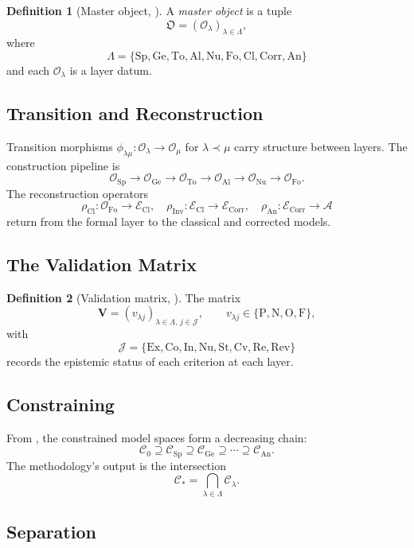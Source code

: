 \documentclass[11pt,a4paper]{article}
\theoremstyle{definition}
\newtheorem{definition}{Definition}[section]
\theoremstyle{plain}
\newcommand{\Lam}{\Lambda}
\newcommand{\Sp}{\mathrm{Sp}}
\newcommand{\Ge}{\mathrm{Ge}}
\newcommand{\To}{\mathrm{To}}
\newcommand{\Al}{\mathrm{Al}}
\newcommand{\Nu}{\mathrm{Nu}}
\newcommand{\Fo}{\mathrm{Fo}}
\newcommand{\Cl}{\mathrm{Cl}}
\newcommand{\Corr}{\mathrm{Corr}}
\newcommand{\Inv}{\mathrm{Inv}}
\newcommand{\An}{\mathrm{An}}
\newcommand{\Ob}{\mathfrak{O}}
\newcommand{\Ccal}{\mathcal{C}}
\newcommand{\Acal}{\mathcal{A}}
\newcommand{\Ecal}{\mathcal{E}}
\newcommand{\Ocal}{\mathcal{O}}
\newcommand{\philam}{\phi_{\lambda\mu}}
\newcommand{\Vmat}{\mathbf{V}}
\newcommand{\Jset}{\mathcal{J}}
\newcommand{\Pmark}{\mathrm{P}}
\newcommand{\Nmark}{\mathrm{N}}
\newcommand{\Omark}{\mathrm{O}}
\newcommand{\Fmark}{\mathrm{F}}
\begin{document}
\begin{definition}[Master object, {\cite[Definition 1.1]{framework}}]
A \emph{master object} is a tuple
\[
  \Ob = (\Ocal_\lambda)_{\lambda \in \Lam},
\]
where
\[
  \Lam = \{\Sp, \Ge, \To, \Al, \Nu, \Fo, \Cl, \Corr, \An\}
\]
and each $\Ocal_\lambda$ is a layer datum.
\end{definition}

\subsection{Transition and Reconstruction}

Transition morphisms $\philam : \Ocal_\lambda \to \Ocal_\mu$ for
$\lambda \prec \mu$ carry structure between layers. The
construction pipeline is
\[
  \Ocal_\Sp \to \Ocal_\Ge \to \Ocal_\To \to \Ocal_\Al
  \to \Ocal_\Nu \to \Ocal_\Fo .
\]
The reconstruction operators
\[
  \rho_\Cl : \Ocal_\Fo \to \Ecal_\Cl, \quad
  \rho_\Inv : \Ecal_\Cl \to \Ecal_\Corr, \quad
  \rho_\An : \Ecal_\Corr \to \Acal
\]
return from the formal layer to the classical and corrected
models.

\subsection{The Validation Matrix}

\begin{definition}[Validation matrix, {\cite[Definition 1.6]{framework}}]
The matrix
\[
  \Vmat = (v_{\lambda j})_{\lambda \in \Lam, \, j \in \Jset},
  \qquad
  v_{\lambda j} \in \{\Pmark, \Nmark, \Omark, \Fmark\},
\]
with
\[
  \Jset = \{\mathrm{Ex}, \mathrm{Co}, \mathrm{In}, \mathrm{Nu},
          \mathrm{St}, \mathrm{Cv}, \mathrm{Re}, \mathrm{Rev}\}
\]
records the epistemic status of each criterion at each layer.
\end{definition}

\subsection{Constraining}

From \cite{paperI}, the constrained model spaces form a decreasing
chain:
\[
  \Ccal_0 \supseteq \Ccal_\Sp \supseteq \Ccal_\Ge \supseteq \cdots
  \supseteq \Ccal_\An .
\]
The methodology's output is the intersection
\[
  \Ccal_\ast = \bigcap_{\lambda \in \Lam} \Ccal_\lambda .
\]

\subsection{Separation}
\end{document}
